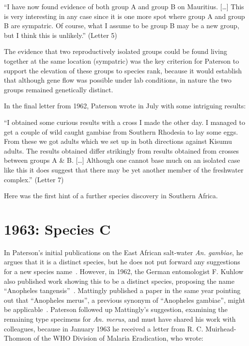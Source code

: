 \documentclass[a4paper,11pt,abstracton,hidelinks]{scrartcl}
\begin{document}
\begin{displayquote}
``I have now found evidence of both group A and group B on Mauritius. [\ldots] This is very interesting in any case since it is one more spot where group A and group B are sympatric. Of course, what I assume to be group B may be a new group, but I think this is unlikely.'' (Letter 5)
\end{displayquote}


The evidence that two reproductively isolated groups could be found living together at the same location (sympatric) was the key criterion for Paterson to support the elevation of these groups to species rank, because it would establish that although gene flow was possible under lab conditions, in nature the two groups remained genetically distinct.


In the final letter from 1962, Paterson wrote in July with some intriguing results:


\begin{displayquote}
``I obtained some curious results with a cross I made the other day.
I managed to get a couple of wild caught gambiae from Southern Rhodesia to lay some eggs. From these we got adults which we set up in both directions against Kisumu adults. The results obtained differ strikingly from results obtained from crosses between groups A \& B. [\ldots] Although one cannot base much on an isolated case like this it does suggest that there may be yet another member of the freshwater complex.'' (Letter 7)
\end{displayquote}


Here was the first hint of a further species discovery in Southern Africa.


\section{1963: Species C}\label{sec:1963}


In Paterson's initial publications on the East African salt-water \textit{An. gambiae}, he argues that it is a distinct species, but he does not put forward any suggestions for a new species name~\parencite{Paterson1962a,Paterson1962b}.
%
However, in 1962, the German entomologist F. Kuhlow also published work showing this to be a distinct species, proposing the name ``Anopheles tangensis''~\parencite{Kuhlow1962}.
%
Mattingly published a paper in the same year pointing out that ``Anopheles merus'', a previous synonym of ``Anopheles gambiae'', might be applicable~\parencite{Mattingly1962}.
%
Paterson followed up Mattingly's suggestion, examining the remaining type specimens for \textit{An. merus}, and must have shared his work with colleagues, because in January 1963 he received a letter from R. C. Muirhead-Thomson of the WHO Division of Malaria Eradication, who wrote:
\end{document}
